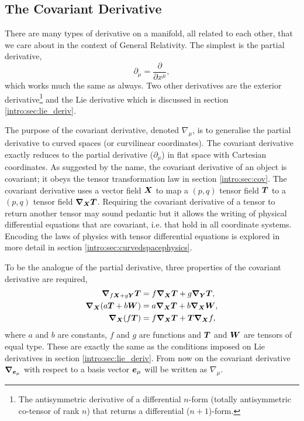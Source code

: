 \subsection{The Covariant Derivative}\label{intro:sec:covariant_derivative}

There are many types of derivative on a manifold, all related to each other, that we care about in the context of General Relativity. The simplest is the partial derivative, 
\begin{equation}
\partial_\mu = \frac{\partial}{\partial x^\mu},
\end{equation} 
which works much the same as always. Two other derivatives are the exterior derivative\footnote{The antisymmetric derivative of a differential $n$-form (totally antisymmetric co-tensor of rank $n$) that returns a differential ($n+1$)-form. } and the Lie derivative which is discussed in section \ref{intro:sec:lie_deriv}. 

The purpose of the covariant derivative, denoted $\nabla_\mu$, is to generalise the partial derivative to curved spaces (or curvilinear coordinates). The covariant derivative exactly reduces to the partial derivative ($\partial_\mu$) in flat space with Cartesian coordinates. As suggested by the name, the covariant derivative of an object is covariant; it obeys the tensor transformation law in section \ref{intro:sec:cov}. The covariant derivative uses a vector field $\boldsymbol{X}$ to map a $(p,q)$ tensor field $\boldsymbol{T}$ to 
 a $(p,q)$ tensor field ${\boldsymbol{\nabla}_{\boldsymbol{X}}} \boldsymbol{T}$. Requiring the covariant derivative of a tensor to return another tensor may sound pedantic but it allows the writing of physical differential equations that are covariant, i.e. that hold in all coordinate systems. Encoding the laws of physics with tensor differential equations is explored in more detail in section \ref{intro:sec:curvedspacephysics}. 

To be the analogue of the partial derivative, three properties of the covariant derivative are required,
\begin{align}
\label{intro:eq:cov-lin}\boldsymbol{\nabla}_{f\boldsymbol{X} + g\boldsymbol{Y}}\boldsymbol{T} &= f\boldsymbol{\nabla}_{\boldsymbol{X}}\boldsymbol{T} + g\boldsymbol{\nabla}_{\boldsymbol{Y}}\boldsymbol{T} , \\
\label{intro:eq:cov-ass}\boldsymbol{\nabla}_{\boldsymbol{X}}( a\boldsymbol{T} + b\boldsymbol{W}) &= a\boldsymbol{\nabla}_{\boldsymbol{X}}\boldsymbol{T} + b\boldsymbol{\nabla}_{\boldsymbol{X}}\boldsymbol{W} , \\
\label{intro:eq:cov-pro}\boldsymbol{\nabla}_{\boldsymbol{X}}( f\boldsymbol{T}) &= f\boldsymbol{\nabla}_{\boldsymbol{X}}\boldsymbol{T} + \boldsymbol{T} \boldsymbol{\nabla}_{\boldsymbol{X}}f , 
\end{align}
where $a$ and $b$ are constants, $f$ and $g$ are functions and $\boldsymbol{T}$ and $\boldsymbol{W}$ are tensors of equal type. These are exactly the same as the conditions imposed on Lie derivatives in section \ref{intro:sec:lie_deriv}. From now on the covariant derivative $\boldsymbol{\nabla}_{\boldsymbol{e}_\mu}$ with respect to a basis vector $\boldsymbol{e}_\mu$ will be written as $\nabla_\mu$.

